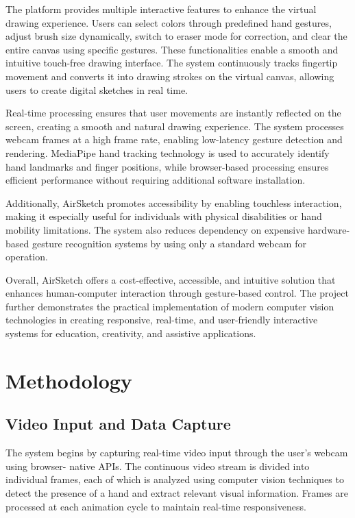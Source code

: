 \documentclass[conference]{IEEEtran}
\begin{document}
The platform provides multiple interactive features to enhance the virtual drawing experience. Users can select colors through predefined hand gestures, adjust brush size dynamically, switch to eraser mode for correction, and clear the entire canvas using specific gestures. These functionalities enable a smooth and intuitive touch-free drawing interface. The system continuously tracks fingertip movement and converts it into drawing strokes on the virtual canvas, allowing users to create digital sketches in real time.

Real-time processing ensures that user movements are instantly reflected on the screen, creating a smooth and natural drawing experience. The system processes webcam frames at a high frame rate, enabling low-latency gesture detection and rendering. MediaPipe hand tracking technology is used to accurately identify hand landmarks and finger positions, while browser-based processing ensures efficient performance without requiring additional software installation.

Additionally, AirSketch promotes accessibility by enabling touchless interaction, making it especially useful for individuals with physical disabilities or hand mobility limitations. The system also reduces dependency on expensive hardware-based gesture recognition systems by using only a standard webcam for operation.

Overall, AirSketch offers a cost-effective, accessible, and intuitive solution that enhances human-computer interaction through gesture-based control. The project further demonstrates the practical implementation of modern computer vision technologies in creating responsive, real-time, and user-friendly interactive systems for education, creativity, and assistive applications.

\section{Methodology}

\subsection{Video Input and Data Capture}
The system begins by capturing real-time video input through the user's webcam using browser-
native APIs. The continuous video stream is divided into individual frames, each of which is
analyzed using computer vision techniques to detect the presence of a hand and extract relevant
visual information. Frames are processed at each animation cycle to maintain real-time
responsiveness.
\end{document}
